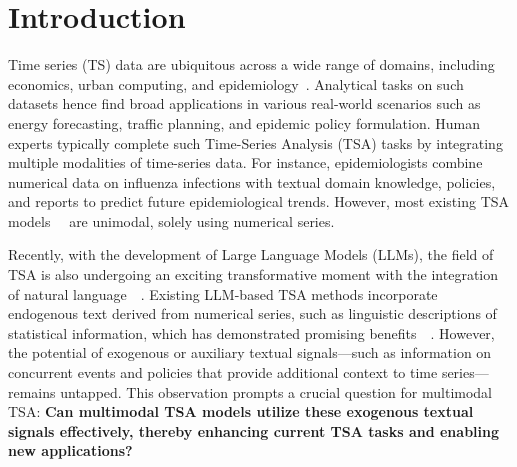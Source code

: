 \section{Introduction}
Time series (TS) data are ubiquitous across a wide range of domains, including economics, urban computing, and epidemiology~\cite{sezer2020financial,tabassum2021actionable,kamarthi2021doubt}. Analytical tasks on such datasets hence find broad applications in various real-world scenarios such as energy forecasting, traffic planning, and epidemic policy formulation. Human experts typically complete such Time-Series Analysis (TSA) tasks by integrating multiple modalities of time-series data. For instance, epidemiologists combine numerical data on influenza infections with textual domain knowledge, policies, and reports to predict future epidemiological trends. However, most existing TSA models~~\cite{vaswani2017attention,liu2023itransformer,zhang2022crossformer,liu2022non,zhou2022film,kitaev2020reformer,zhou2021informer,nie2022time} are unimodal, solely using numerical series. 

Recently, with the development of Large Language Models (LLMs), the field of TSA is also undergoing an exciting transformative moment with the integration of natural language~~\cite{yu2023temporal, li2024frozen}. Existing LLM-based TSA methods incorporate endogenous text derived from numerical series, such as linguistic descriptions of statistical information, which has demonstrated promising benefits~~\cite{gruver2024large, jin2023time, cao2023tempo, liu2024lstprompt}. However, the potential of exogenous or auxiliary textual signals—such as information on concurrent events and policies that provide additional context to time series—remains untapped. This observation prompts a crucial question for multimodal TSA: \textbf{Can multimodal TSA models utilize these exogenous textual signals effectively, thereby enhancing current TSA tasks and enabling new applications?}

